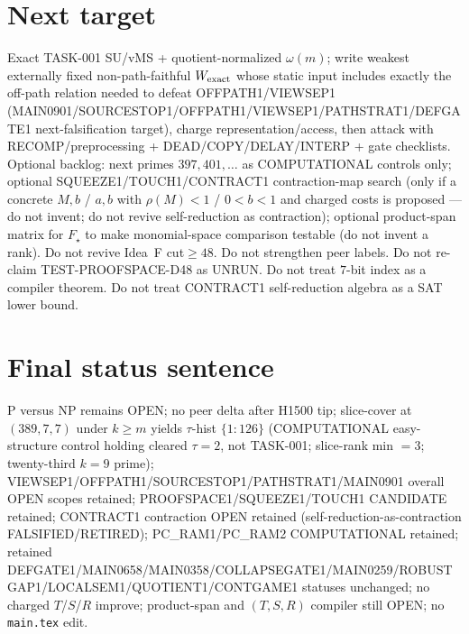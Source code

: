 \documentclass[11pt]{article}
\begin{document}
\section*{Next target}
Exact TASK-001 SU/vMS + quotient-normalized $\omega(m)$; write weakest externally fixed non-path-faithful
$W_{\rm exact}$ whose static input includes exactly the off-path relation needed to defeat OFFPATH1/VIEWSEP1
(MAIN0901/SOURCESTOP1/OFFPATH1/VIEWSEP1/PATHSTRAT1/DEFGATE1 next-falsification target), charge representation/access,
then attack with RECOMP/preprocessing + DEAD/COPY/DELAY/INTERP + gate checklists.
Optional backlog: next primes $397,401,\ldots$ as COMPUTATIONAL controls only;
optional SQUEEZE1/TOUCH1/CONTRACT1 contraction-map search (only if a concrete $M,b$ / $a,b$ with $\rho(M){<}1$ / $0{<}b{<}1$ and charged costs is proposed --- do not invent; do not revive self-reduction as contraction);
optional product-span matrix for $F_\star$ to make monomial-space comparison testable (do not invent a rank).
Do not revive Idea~F cut$\ge48$. Do not strengthen peer labels.
Do not re-claim TEST-PROOFSPACE-D48 as UNRUN.
Do not treat $7$-bit index as a compiler theorem.
Do not treat CONTRACT1 self-reduction algebra as a SAT lower bound.

\section*{Final status sentence}
P versus NP remains OPEN; no peer delta after H1500 tip; slice-cover at $(389,7,7)$ under $k{\ge}m$ yields $\tau$-hist $\{1{:}126\}$ (COMPUTATIONAL easy-structure control holding cleared $\tau{=}2$, not TASK-001; slice-rank min $=3$; twenty-third $k{=}9$ prime); VIEWSEP1/OFFPATH1/SOURCESTOP1/PATHSTRAT1/MAIN0901 overall OPEN scopes retained; PROOFSPACE1/SQUEEZE1/TOUCH1 CANDIDATE retained; CONTRACT1 contraction OPEN retained (self-reduction-as-contraction FALSIFIED/RETIRED); PC\_RAM1/PC\_RAM2 COMPUTATIONAL retained; retained DEFGATE1/MAIN0658/MAIN0358/COLLAPSEGATE1/MAIN0259/ROBUSTGAP1/LOCALSEM1/QUOTIENT1/CONTGAME1 statuses unchanged; no charged $T$/$S$/$R$ improve; product-span and $(T,S,R)$ compiler still OPEN; no \texttt{main.tex} edit.
\end{document}
